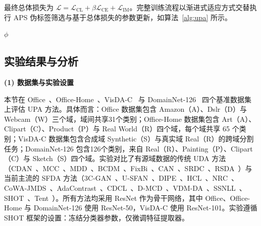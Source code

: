 最终总体损失为 $\mathcal{L} = \mathcal{L}_{\text{CL}} + \beta \mathcal{L}_{\text{CE}} + \mathcal{L}_{\text{IM}}$。完整训练流程以渐进式适应方式交替执行 APS 伪标签筛选与基于总体损失的参数更新，如算法~\ref{alg:upa} 所示。

\begin{algorithm}[!htb]
  \label{alg:upa} 
  \small
  \BlankLine
  \Return $\phi$
\end{algorithm}

\subsection{实验结果与分析}

\noindent\textbf{(1) 数据集与实验设置}

本节在 Office~\cite{saenko2010adapting}、Office-Home~\cite{venkateswara2017deep}、VisDA-C~\cite{peng2017visda} 与 DomainNet-126~\cite{peng2019moment} 四个基准数据集上评估 UPA 方法。具体而言：Office 数据集包含 Amazon（A）、Dslr（D）与 Webcam（W）三个域，域间共享31个类别；Office-Home 数据集包含 Art（A）、Clipart（C）、Product（P）与 Real World（R）四个域，每个域共享 65 个类别；VisDA-C 数据集包含合成域 Synthetic（S）与真实域 Real（R）的跨域分割任务；DomainNet-126 包含126个类别，来自 Real（R）、Painting（P）、Clipart（C）与 Sketch（S）四个域。实验对比了有源域数据的传统 UDA 方法（CDAN~\cite{CDAN}、MCC~\cite{MCC}、MDD~\cite{MDD}、BCDM~\cite{BCDM}、FixBi~\cite{FIxBi}、CAN~\cite{CAN}、SRDC~\cite{SRDC}、RSDA~\cite{RSDA}）与当前主流的 SFDA 方法（3C-GAN~\cite{3C-GAN}、U-SFAN~\cite{U-SFAN}、DIPE~\cite{DIPE}、HCL~\cite{HCL}、NRC~\cite{yang2021neighbor}、CoWA-JMDS~\cite{cowa}、AdaContrast~\cite{AdaContrast}、CDCL~\cite{wang2022cross}、D-MCD~\cite{chu2022denoised}、VDM-DA~\cite{tian2022vdm}、SSNLL~\cite{chen2022self}、SHOT~\cite{liang2021source}、Tent~\cite{tent}）。所有方法均采用 ResNet 作为骨干网络，其中 Office、Office-Home 与 DomainNet-126 使用 ResNet-50，VisDA-C 使用 ResNet-101。实验遵循 SHOT 框架的设置：冻结分类器参数，仅微调特征提取器。

